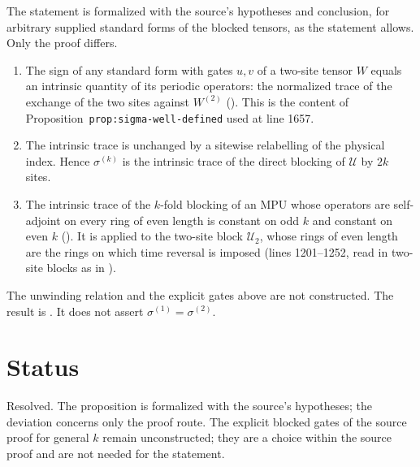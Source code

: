 \documentclass{article}
\begin{document}
The statement is formalized with the source's hypotheses and conclusion, for
arbitrary supplied standard forms of the blocked tensors, as the statement
allows. Only the proof differs.
\begin{enumerate}
    \item The sign of any standard form with gates $u,v$ of a two-site tensor
          $W$ equals an intrinsic quantity of its periodic operators: the
          normalized trace of the exchange of the two sites against $W^{(2)}$
          ().
          This is the content of Proposition~\texttt{prop:sigma-well-defined}
          used at line 1657.
    \item The intrinsic trace is unchanged by a sitewise relabelling of the
          physical index. Hence $\sigma^{(k)}$ is the intrinsic trace of the
          direct blocking of $\mathcal U$ by $2k$ sites.
    \item The intrinsic trace of the $k$-fold blocking of an MPU whose
          operators are self-adjoint on every ring of even length is constant on
          odd $k$ and constant on even $k$
          (). It is
          applied to the two-site block $\mathcal U_2$, whose rings of even
          length are the rings on which time reversal is imposed (lines
          1201--1252, read in two-site blocks as in
          ).
\end{enumerate}
The unwinding relation and the explicit gates above are not constructed. The
result is .
It does not assert $\sigma^{(1)}=\sigma^{(2)}$.

\section{Status}

Resolved. The proposition is formalized with the source's hypotheses; the
deviation concerns only the proof route. The explicit blocked gates of the
source proof for general $k$ remain unconstructed; they are a choice within
the source proof and are not needed for the statement.



\end{document}
